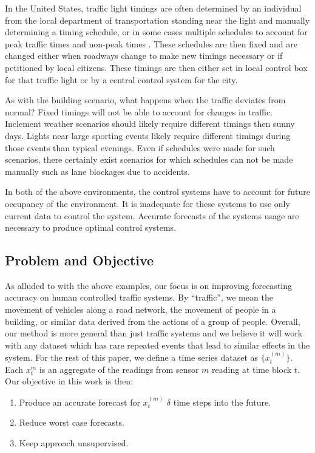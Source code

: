 In the United States, traffic light timings are often determined by an individual from the local department of transportation standing near the light and manually determining a timing schedule, or in some cases multiple schedules to account for peak traffic times and non-peak times \cite{Koonce2008}.  These schedules are then fixed and are changed either when roadways change to make new timings necessary or if petitioned by local citizens.  These timings are then either set in local control box for that traffic light or by a central control system for the city.  

As with the building scenario, what happens when the traffic deviates from normal?  Fixed timings will not be able to account for changes in traffic.  Inclement weather scenarios should likely require different timings then sunny days.  Lights near large sporting events likely require different timings during those events than typical evenings.  Even if schedules were made for such scenarios, there certainly exist scenarios for which schedules can not be made manually such as lane blockages due to accidents. 

In both of the above environments, the control systems have to account for future occupancy of the environment.  It is inadequate for these systems to use only current data to control the system.  Accurate forecasts of the systems usage are necessary to produce optimal control systems.  

\subsection{Problem and Objective}
As alluded to with the above examples, our focus is on improving forecasting accuracy on human controlled traffic systems.  By “traffic”, we mean the movement of vehicles along a road network, the movement of people in a building, or similar data derived from the actions of a group of people.  Overall, our method is more general than just traffic systems and we believe it will work with any dataset which has rare repeated events that lead to similar effects in the system.  For the rest of this paper, we define a time series dataset as $\{x_{t}^{(m)}\}$.  Each $x_{t}^{m}$ is an aggregate of the readings from sensor $m$ reading at time block $t$.  Our objective in this work is then:

\begin{enumerate}
	\item Produce an accurate forecast for $x_{t}^{(m)}$ $\delta$ time steps into the future.
	\item Reduce worst case forecasts.
	\item Keep approach unsupervised.
\end{enumerate}

